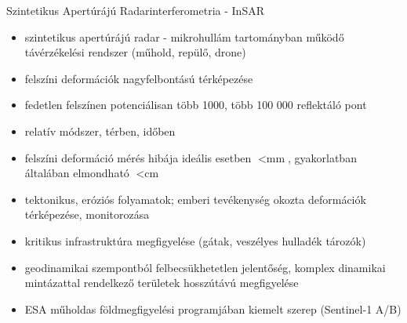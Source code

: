 \documentclass{beamer}
\begin{document}
\begin{frame}{Szintetikus Apertúrájú Radarinterferometria - InSAR}

\begin{itemize}
    \item szintetikus apertúrájú radar - mikrohullám tartományban működő
    távérzékelési rendszer (műhold, repülő, drone)
    \item felszíni deformációk nagyfelbontású térképezése
    \item fedetlen felszínen potenciálisan több 1000, több 100 000 reflektáló pont
    \item relatív módszer, térben, időben
    \item felszíni deformáció mérés hibája ideális esetben $< \text{mm}$,
    gyakorlatban általában elmondható $< \text{cm}$
    \item tektonikus, eróziós folyamatok; emberi tevékenység okozta
    deformációk térképezése, monitorozása
    \item kritikus infrastruktúra megfigyelése (gátak, veszélyes hulladék
    tározók)
    \item geodinamikai szempontból felbecsükhetetlen jelentőség, komplex
    dinamikai mintázattal rendelkező területek hosszútávú megfigyelése
    \item ESA műholdas földmegfigyelési programjában kiemelt szerep
    (Sentinel-1 A/B)
\end{itemize}

\end{frame}
\end{document}
